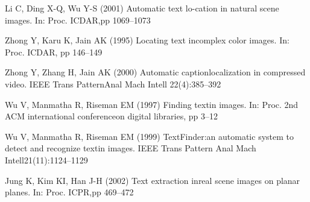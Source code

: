 \documentclass[oneside,final,14pt]{extreport}
\begin{document}
\begin{thebibliography}{0}
Li C, Ding X-Q, Wu Y-S (2001) Automatic text lo-cation  in  natural  scene  images.  In:  Proc.  ICDAR,pp 1069–1073

Zhong Y, Karu K, Jain AK (1995) Locating text incomplex color images. In: Proc. ICDAR, pp 146–149﻿

Zhong Y, Zhang H, Jain AK (2000) Automatic captionlocalization in compressed video. IEEE Trans PatternAnal Mach Intell 
22(4):385–392

Wu V, Manmatha R, Riseman EM (1997) Finding textin images. In: Proc. 2nd ACM international conferenceon digital libraries, pp 3–12

Wu V, Manmatha R, Riseman EM (1999) TextFinder:an  automatic  system  to  detect  and  recognize  textin  images.  IEEE  Trans  Pattern  Anal  Mach  Intell21(11):1124–1129

Jung K, Kim KI, Han J-H (2002) Text extraction inreal scene images on planar planes. In: Proc. ICPR,pp 469–472

\end{thebibliography}
\end{document}
